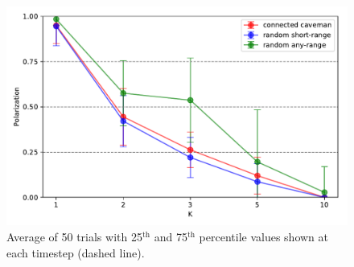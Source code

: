 \documentclass[11pt,letterpaper]{article}
\begin{document}
\begin{figure}
\begin{center}
  \includegraphics[width=\textwidth]{Figures/figure12b.pdf}
\end{center}
  \caption{Average of 50 trials with 25$^{\mathrm{th}}$ and 75$^{\mathrm{th}}$ percentile values
    shown at each timestep (dashed line).}
\label{fig:}
\end{figure}





\setlength{\bibleftmargin}{.125in}
\setlength{\bibindent}{-\bibleftmargin}


\end{document}
